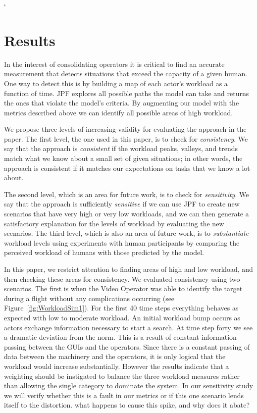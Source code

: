 `\section{Results}
In the interest of consolidating operators it is critical to find an accurate measurement that detects situations that exceed the capacity of a given human. One way to detect this is by building a map of each actor's workload as a function of time. JPF explores all possible paths the model can take and returns the ones that violate the model's criteria. By augmenting our model with the metrics described above we can identify all possible areas of high workload. 

We propose three levels of increasing validity for evaluating the approach in the paper.  The first level, the one used in this paper, is to check for {\em consistency}.  We say that the approach is {\em consistent} if the workload peaks, valleys, and trends match what we know about a small set of given situations; in other words, the approach is consistent if it matches our expectations on tasks that we know a lot about.  

The second level, which is an area for future work, is to check for {\em sensitivity}.  We say that  the approach is sufficiently {\em sensitive} if we can use JPF to create new scenarios that have very high or very low workloads, and we can then generate a satisfactory explanation for the levels of workload by evaluating the new scenarios.  The third level, which is also an area of future work, is to {\em substantiate} workload levels using experiments with human participants by comparing the perceived workload of humans with those predicted by the model.

In this paper, we restrict attention to finding areas of high and low workload, and then checking these areas for consistency.  We evaluated consistency using two scenarios.  The first is when the Video Operator was able to identify the target during a flight without any complications occurring (see Figure~\ref{fig:WorkloadSim1}). For the first 40 time steps everything behaves as expected with low to moderate workload. An initial workload bump occurs as actors exchange information necessary to start a search.   At time step forty we see a dramatic deviation from the norm. This is a result of constant information passing between the GUIs and the operators. Since there is a constant passing of data between the machinery and the operators, it is only logical that the workload would increase substantially. However the results indicate that a weighting should be instigated to balance the three workload measures rather than allowing the single category to dominate the system. In our sensitivity study we will verify whether this is a fault in our metrics or if this one scenario lends itself to the distortion.  {\sc what happens to cause this spike, and why does it abate?}

